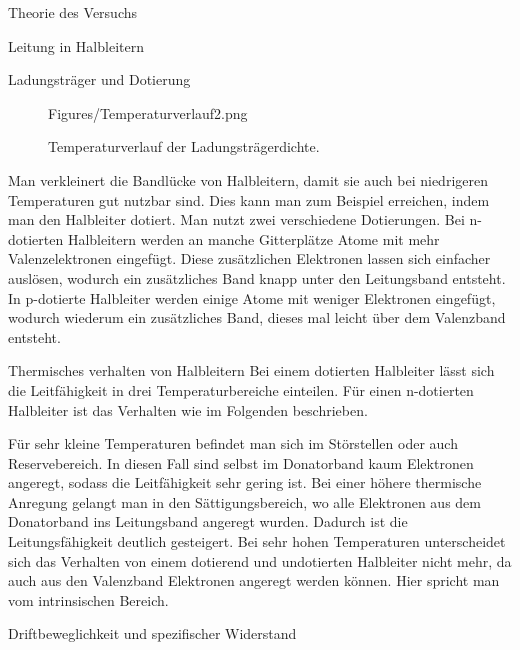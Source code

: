 \documentclass[pdftex, a4paper,11pt, twoside, ngerman]{report}
\begin{document}
\begin{chapter}{Theorie des Versuchs}
\begin{section}{Leitung in Halbleitern}
\begin{subsection}{Ladungsträger und Dotierung}
\begin{figure}[b!]
\begin{minipage}{.45\textwidth}
                    {Figures/Temperaturverlauf2.png}
                \caption{Temperaturverlauf der Ladungsträgerdichte.
                    \cite{bib:Temperaturverlauf2}}
                \label{fig:TemperaturverlaufLeifaehigkeit}
              \end{minipage}
            \end{figure}
            
            Man verkleinert die Bandlücke von Halbleitern, damit sie auch bei niedrigeren Temperaturen gut nutzbar sind.
            Dies kann man zum Beispiel erreichen, indem man den Halbleiter dotiert.
            Man nutzt zwei verschiedene Dotierungen. 
            Bei n-dotierten Halbleitern werden an manche Gitterplätze Atome mit mehr Valenzelektronen eingefügt.
            Diese zusätzlichen Elektronen lassen sich einfacher auslösen, wodurch ein zusätzliches Band knapp unter den Leitungsband entsteht.
            In p-dotierte Halbleiter werden einige Atome mit weniger Elektronen eingefügt, wodurch wiederum ein zusätzliches Band, dieses mal leicht über dem Valenzband entsteht.

        \end{subsection}

        \begin{subsection}{Thermisches verhalten von Halbleitern}
            Bei einem dotierten Halbleiter lässt sich die Leitfähigkeit in drei Temperaturbereiche einteilen.
            Für einen n-dotierten Halbleiter ist das Verhalten wie im Folgenden beschrieben.
            
            Für sehr kleine Temperaturen befindet man sich im Störstellen oder auch Reservebereich. In diesen Fall sind selbst im Donatorband kaum Elektronen angeregt, sodass die Leitfähigkeit sehr gering ist.
            Bei einer höhere thermische Anregung gelangt man in den Sättigungsbereich, wo alle Elektronen aus dem Donatorband ins Leitungsband angeregt wurden.
            Dadurch ist die Leitungsfähigkeit deutlich gesteigert.
            Bei sehr hohen Temperaturen unterscheidet sich das Verhalten von einem dotierend und undotierten Halbleiter nicht mehr, da auch aus den Valenzband Elektronen angeregt werden können.
            Hier spricht man vom intrinsischen Bereich.

        \end{subsection}

        \begin{subsection}{Driftbeweglichkeit und spezifischer Widerstand}
        

\end{subsection}
\end{section}
\end{chapter}
\end{document}

